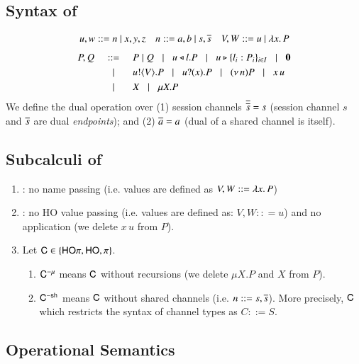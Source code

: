 \subsection{Syntax of \HOp}
\label{subsec:syntax}
\[ 
\begin{array}{lll}
u,w  ::=  n \ | \ x,y,z
& n ::= a,b  \ | \ s, \overline{s} 
& V,W  ::=   u \ | \ \lambda x.\,P
\end{array}
\]
\[
\begin{array}{rclllll}
P,Q & ::= &  P\;|\; Q \;\;\;|\;\;\; 
 u \triangleleft l . P \;\;\;|\;\;\; u \triangleright \{l_i:P_i\}_{i \in I} \;\;\;|\;\;\; \mathbf{0} \\[1mm]
  & \;\;\;|\;\;\; & u ! \langle V \rangle .{P} \;\;\;|\;\;\; u ? (x) .{P} \;\;\;|\;\;\; (\nu\, n) P 
\;\;\;|\;\;\; x\, {u} 
\\[1mm]
      & \;\;\;|\;\;\; & X \;\;\;|\;\;\; \mu X. P
\end{array}
\]
We define the dual operation over (1) session channels $\overline{\overline{s}} = s$
(session channel $s$ and $\overline{s}$ are dual \emph{endpoints}); and 
(2) $\overline{a} = a$ (dual of a shared channel is itself).  

\subsection{Subcalculi of \HOp}
\label{subsec:subcalculi}
\begin{enumerate}[$\bullet$]
\item \HO: no name passing (i.e. values are defined as $V,W :: = \lambda x.\,P$)
\item \sessp: no HO value passing (i.e. 
values are defined as:
$V,W :: = u$) and no application (we delete $x\, u$ from $P$). 
\item Let $\mathsf{C} \in \{\mathsf{HO}\pi, \mathsf{HO}, \pi\}$. 
\begin{enumerate}[-]
\item $\mathsf{C}^{-\mu}$ means 
$\mathsf{C}$ without recursions (we delete $\mu X.P$ and $X$ from $P$).   
\item 
$\mathsf{C}^{-\mathsf{sh}}$ means $\mathsf{C}$ without shared channels (i.e. 
$n ::= s, \overline{s}$). More precisely, $\mathsf{C}$ which restricts 
the syntax of channel types as $C::= S$.  
\end{enumerate}
\end{enumerate}

\subsection{Operational Semantics}
\label{subsec:semantics}


